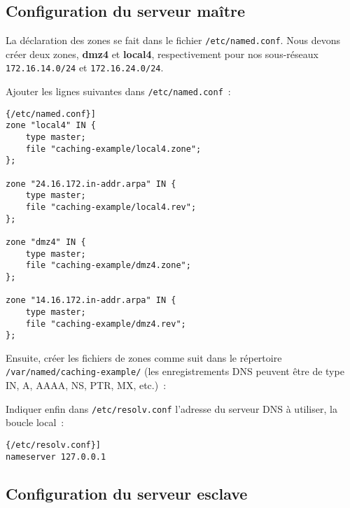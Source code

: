 \documentclass[11pt,a4paper,oneside]{article}
\newcommand{\inlinecode}{\lstinline[breaklines=true]}
\begin{document}
\subsection{Configuration du serveur maître}

La déclaration des zones se fait dans le fichier \inlinecode{/etc/named.conf}.
Nous devons créer deux zones, \textbf{dmz4} et \textbf{local4}, respectivement
pour nos sous-réseaux \inlinecode{172.16.14.0/24} et
\inlinecode{172.16.24.0/24}.

Ajouter les lignes suivantes dans \inlinecode{/etc/named.conf}~:
\begin{lstlisting}[caption=\inlinecode{/etc/named.conf}]
zone "local4" IN {
	type master;
	file "caching-example/local4.zone";
};

zone "24.16.172.in-addr.arpa" IN {
	type master;
	file "caching-example/local4.rev";
};

zone "dmz4" IN {
	type master;
	file "caching-example/dmz4.zone";
};

zone "14.16.172.in-addr.arpa" IN {
	type master;
	file "caching-example/dmz4.rev";
};
\end{lstlisting}

Ensuite, créer les fichiers de zones comme suit dans le répertoire
\inlinecode{/var/named/caching-example/} (les enregistrements DNS peuvent être
de type IN, A, AAAA, NS, PTR, MX, etc.)~:





Indiquer enfin dans \inlinecode{/etc/resolv.conf} l'adresse du serveur DNS à
utiliser, la boucle local~:
\begin{lstlisting}[caption=\inlinecode{/etc/resolv.conf}]
nameserver 127.0.0.1
\end{lstlisting}

\subsection{Configuration du serveur esclave}
\end{document}
